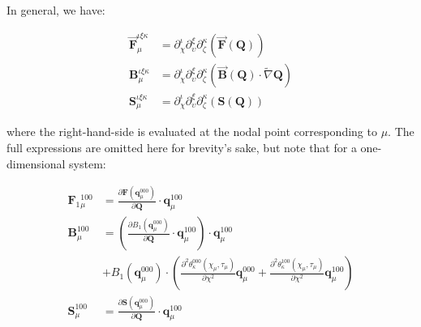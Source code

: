 \documentclass[twoside,english,final,5p,times,twocolumn]{elsarticle}
\begin{document}
In general, we have:

\begin{subequations}

\begin{align}
\overrightarrow{\boldsymbol{F}}_{\mu}^{\iota\xi\kappa} & =\partial_{\chi}^{\iota}\partial_{\upsilon}^{\xi}\partial_{\zeta}^{\kappa}\left(\overrightarrow{\boldsymbol{F}}\left(\boldsymbol{Q}\right)\right)\\
\boldsymbol{B}_{\mu}^{\iota\xi\kappa} & =\partial_{\chi}^{\iota}\partial_{\upsilon}^{\xi}\partial_{\zeta}^{\kappa}\left(\overrightarrow{\boldsymbol{B}}\left(\boldsymbol{Q}\right)\cdot\tilde{\nabla}\boldsymbol{Q}\right)\\
\boldsymbol{S}_{\mu}^{\iota\xi\kappa} & =\partial_{\chi}^{\iota}\partial_{\upsilon}^{\xi}\partial_{\zeta}^{\kappa}\left(\boldsymbol{S}\left(\boldsymbol{Q}\right)\right)\label{eq:S coeffs}
\end{align}

\end{subequations}

where the right-hand-side is evaluated at the nodal point corresponding
to $\mu$. The full expressions are omitted here for brevity's sake,
but note that for a one-dimensional system:

\begin{subequations}

\begin{align}
\boldsymbol{F}_{1}{}_{\mu}^{100} & =\frac{\partial\boldsymbol{F}\left(\boldsymbol{q}_{\mu}^{000}\right)}{\partial\boldsymbol{Q}}\cdot\boldsymbol{q}_{\mu}^{100}\\
\boldsymbol{B}_{\mu}^{100} & =\left(\frac{\partial B_{1}\left(\boldsymbol{q}_{\mu}^{000}\right)}{\partial\boldsymbol{Q}}\cdot\boldsymbol{q}_{\mu}^{100}\right)\cdot\boldsymbol{q}_{\mu}^{100}\\
 & +B_{1}\left(\boldsymbol{q}_{\mu}^{000}\right)\cdot\left(\frac{\partial^{2}\theta_{\kappa}^{000}\left(\chi_{\mu},\tau_{\mu}\right)}{\partial\chi^{2}}\boldsymbol{q}_{\mu}^{000}+\frac{\partial^{2}\theta_{\kappa}^{100}\left(\chi_{\mu},\tau_{\mu}\right)}{\partial\chi^{2}}\boldsymbol{q}_{\mu}^{100}\right)\nonumber \\
\boldsymbol{S}_{\mu}^{100} & =\frac{\partial\boldsymbol{S}\left(\boldsymbol{q}_{\mu}^{000}\right)}{\partial\boldsymbol{Q}}\cdot\boldsymbol{q}_{\mu}^{100}
\end{align}

\end{subequations}
\end{document}
